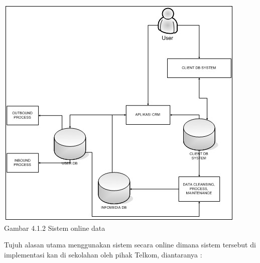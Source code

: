 \begin{center}
\includegraphics[scale=1]{gambar412.jpg}\\
Gambar 4.1.2  Sistem online data
\end{center}
Tujuh alasan utama menggunakan sistem secara online dimana sistem tersebut  di implementasi kan di sekolahan oleh pihak Telkom,  diantaranya :
